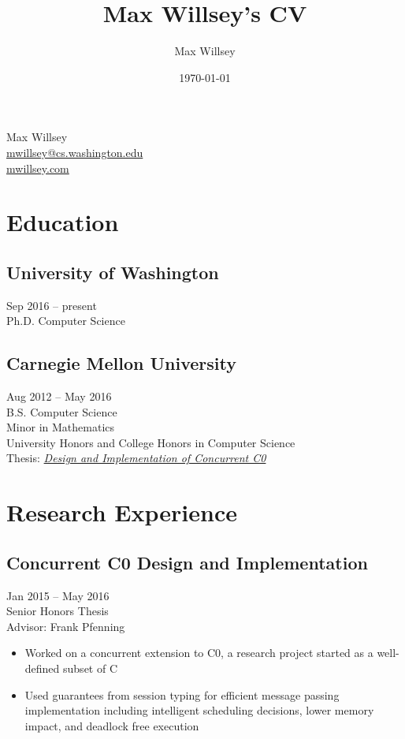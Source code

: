 \documentclass{article}
\title{Max Willsey's CV}
\date{\today}
\author{Max Willsey}
\begin{document}
\begin{center}
  {\LARGE Max Willsey} \\
  \vspace{1em}
  \href{mailto:mwillsey@cs.washington.edu}{mwillsey@cs.washington.edu} \\
  \href{http://mwillsey.com}{mwillsey.com}
\end{center}

\section{Education}

\subsection{University of Washington}
\hfill Sep 2016 -- present \\
Ph.D. Computer Science

\subsection{Carnegie Mellon University}
\hfill Aug 2012 -- May 2016 \\
B.S. Computer Science \\
Minor in Mathematics \\
University Honors and College Honors in Computer Science \\
Thesis: \href{http://maxwillsey.com/papers/cc0-thesis.pdf}{\textit{Design and Implementation of Concurrent C0}}

\section{Research Experience}

\subsection{Concurrent C0 Design and Implementation}
\hfill Jan 2015 -- May 2016 \\
Senior Honors Thesis \\
Advisor: Frank Pfenning
\begin{itemize}
\item Worked on a concurrent extension to C0, a research project started as a well-defined subset of C
\item Used guarantees from session typing for efficient message passing implementation including intelligent scheduling decisions, lower memory impact, and deadlock free execution
\end{itemize}
\end{document}
